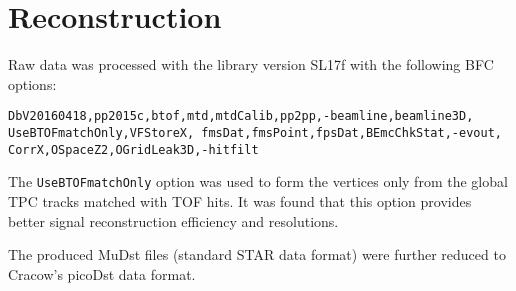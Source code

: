 \section{Reconstruction}\label{sec:reconstruction}
Raw data was processed with the library version SL17f with the following BFC options:
\vspace{1em}

\noindent\texttt{DbV20160418,pp2015c,btof,mtd,mtdCalib,pp2pp,-beamline,beamline3D, \newline UseBTOFmatchOnly,VFStoreX, fmsDat,fmsPoint,fpsDat,BEmcChkStat,-evout,  \newline CorrX,OSpaceZ2,OGridLeak3D,-hitfilt}
\vspace{1em}

The \texttt{UseBTOFmatchOnly} option was used to form the vertices only from the global TPC tracks matched with TOF hits. It was found that this option provides better signal reconstruction efficiency and resolutions. 

The produced MuDst files (standard STAR data format) were further reduced to Cracow's picoDst data format. 
